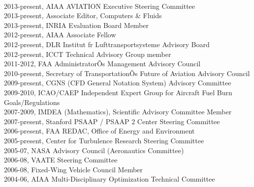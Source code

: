  \\
2013-present, AIAA AVIATION Executive Steering Committee\\
2013-present, Associate Editor, Computers \& Fluids\\
2013-present, INRIA Evaluation Board Member\\
2012-present, AIAA Associate Fellow\\
2012-present, DLR Institut fr Lufttransportsysteme Advisory Board\\
2012-present, ICCT Technical Advisory Group member\\
2011-2012, FAA AdministratorÕs Management Advisory Council\\
2010-present, Secretary of TransportationÕs Future of Aviation Advisory Council\\
2009-present, CGNS (CFD General Notation System) Advisory Committee\\
2009-2010, ICAO/CAEP Independent Expert Group for Aircraft Fuel Burn Goals/Regulations\\
2007-2009, IMDEA (Mathematics), Scientific Advisory Committee Member\\
2007-present, Stanford PSAAP / PSAAP 2 Center Steering Committee\\
2006-present, FAA REDAC, Office of Energy and Environment  \\
2005-present, Center for Turbulence Research Steering Committee \\
2005-07, NASA Advisory Council (Aeronautics Committee)  \\
2006-08, VAATE Steering Committee\\
2006-08, Fixed-Wing Vehicle Council Member\\
2004-06, AIAA Multi-Disciplinary Optimization Technical Committee\\


